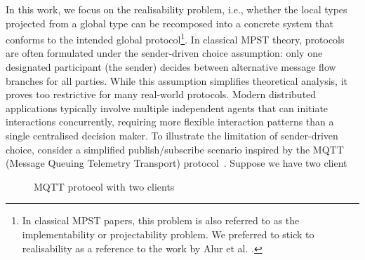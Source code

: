 In this work, we focus on the realisability problem, i.e., whether the local types projected from a global type can be recomposed into a concrete system that conforms to the intended global protocol\footnote{In classical MPST papers, this problem is also referred to as the implementability or projectability problem. We preferred to stick to realisability as a reference to the work by Alur et al. \cite{DBLP:journals/tcs/AlurEY05}.}. In classical MPST theory, protocols are often formulated under the sender-driven choice assumption: only one designated participant (the sender) decides between alternative message flow branches for all parties. 
While this assumption simplifies theoretical analysis, it proves too restrictive for many real-world protocols. 
Modern distributed applications typically involve multiple independent agents that can initiate interactions concurrently, requiring more flexible interaction patterns than a single centralised decision maker.
To illustrate the limitation of sender-driven choice, consider a simplified publish/subscribe scenario inspired by the MQTT (Message Queuing Telemetry Transport) protocol~\cite{mqtt311}.  Suppose we  have two client
\begin{figure}
  \begin{center}
    \caption{\label{fig:MQTT}MQTT protocol with two clients}
     \end{center}
\end{figure}
